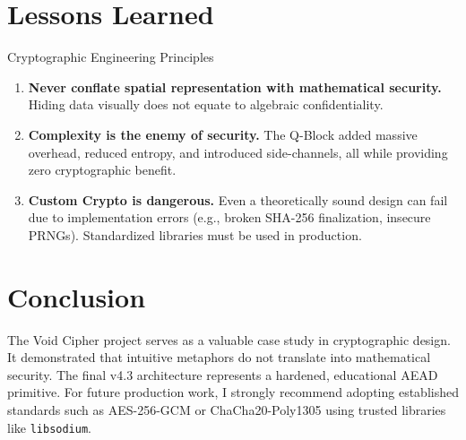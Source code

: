 \documentclass[12pt,a4paper]{article}
\begin{document}
\section{Lessons Learned}
\begin{lessonbox}{Cryptographic Engineering Principles}
\begin{enumerate}
    \item \textbf{Never conflate spatial representation with mathematical security.} Hiding data visually does not equate to algebraic confidentiality.
    \item \textbf{Complexity is the enemy of security.} The Q-Block added massive overhead, reduced entropy, and introduced side-channels, all while providing zero cryptographic benefit.
    \item \textbf{Custom Crypto is dangerous.} Even a theoretically sound design can fail due to implementation errors (e.g., broken SHA-256 finalization, insecure PRNGs). Standardized libraries must be used in production.
\end{enumerate}
\end{lessonbox}

\section{Conclusion}
The Void Cipher project serves as a valuable case study in cryptographic design. It demonstrated that intuitive metaphors do not translate into mathematical security. The final v4.3 architecture represents a hardened, educational AEAD primitive. For future production work, I strongly recommend adopting established standards such as AES-256-GCM or ChaCha20-Poly1305 using trusted libraries like \texttt{libsodium}.
\end{document}
